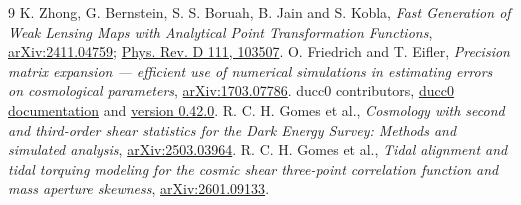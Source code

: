 \documentclass[11pt]{article}
\begin{document}
\begin{thebibliography}{9}
 K. Zhong, G. Bernstein, S. S. Boruah, B. Jain and S. Kobla,
\emph{Fast Generation of Weak Lensing Maps with Analytical Point
Transformation Functions},
\href{https://arxiv.org/abs/2411.04759}{arXiv:2411.04759};
\href{https://doi.org/10.1103/PhysRevD.111.103507}{Phys. Rev. D 111, 103507}.
 O. Friedrich and T. Eifler,
\emph{Precision matrix expansion --- efficient use of numerical simulations
in estimating errors on cosmological parameters},
\href{https://arxiv.org/abs/1703.07786}{arXiv:1703.07786}.
 ducc0 contributors,
\href{https://mtr.pages.mpcdf.de/ducc/}{ducc0 documentation} and
\href{https://pypi.org/project/ducc0/0.42.0/}{version 0.42.0}.
 R. C. H. Gomes et al.,
\emph{Cosmology with second and third-order shear statistics for the Dark
Energy Survey: Methods and simulated analysis},
\href{https://arxiv.org/abs/2503.03964}{arXiv:2503.03964}.
 R. C. H. Gomes et al.,
\emph{Tidal alignment and tidal torquing modeling for the cosmic shear
three-point correlation function and mass aperture skewness},
\href{https://arxiv.org/abs/2601.09133}{arXiv:2601.09133}.
\end{thebibliography}
\end{document}
